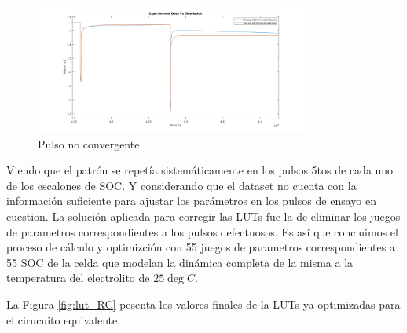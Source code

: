 \documentclass[10pt,a4paper]{article}
\begin{document}
\begin{figure}[h!]
	\begin{center}
        \includegraphics[width=0.8\textwidth]{Vterm_exp_vs_sim_pulse_5_error.png}
		\caption{Pulso no convergente}
		\label{fig:exp_vs_sim_5_error}
	\end{center}
\end{figure}

Viendo que el patrón se repetía sistemáticamente en los pulsos 5tos de cada uno
de los escalones de \acrshort{SOC}. Y considerando que el dataset no cuenta con
la información suficiente para ajustar los parámetros en los pulsos de ensayo en
cuestion. La solución aplicada para corregir las \acrshort{LUT}s fue la de
eliminar los juegos de parametros correspondientes a los pulsos defectuosos. Es
así que concluimos el proceso de cálculo y optimizción con 55 juegos de
parametros correspondientes a 55 \acrshort{SOC} de la celda que modelan la
dinámica completa de la misma a la temperatura del electrolito de $25\deg C$.

La Figura \ref{fig:lut_RC} pesenta los valores finales de la \acrshort{LUT}s ya
optimizadas para el cirucuito equivalente.
\end{document}
